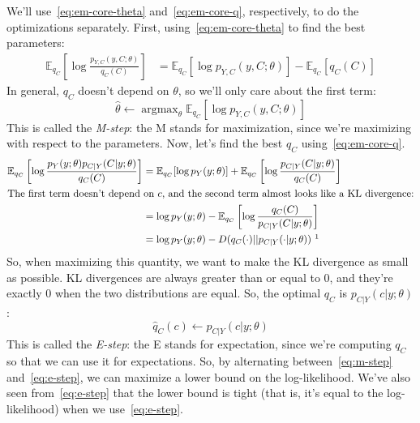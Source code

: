 \documentclass[12pt]{article}
\DeclareMathOperator*{\argmax}{\mathrm{argmax}}
\begin{document}
    We'll use~\eqref{eq:em-core-theta} and~\eqref{eq:em-core-q}, respectively, to
    do the optimizations separately. First, using~\eqref{eq:em-core-theta} to find the
    best parameters:
    \begin{align*}
        \mathbb{E}_{q_C}\left[\log \frac{p_{Y,C}(y,C; \theta)}{q_C(C)} \right]
        &= \mathbb{E}_{q_C}\left[\log p_{Y,C}(y,C; \theta)\right] - \mathbb{E}_{q_C} [q_C(C)]
    \end{align*}
    In general, $q_C$ doesn't depend on $\theta$, so we'll only care about the first term:
    \begin{equation}
        \label{eq:m-step} \boxed{\widehat{\theta} \gets \argmax_\theta \mathbb{E}_{q_C}\left[\log p_{Y,C}(y,C; \theta)\right]}
    \end{equation}
    This is called the \emph{M-step}: the M stands for maximization, since we're
    maximizing with respect to the parameters.
    Now, let's find the best $q_C$ using~\eqref{eq:em-core-q}.
    \begin{align}
        \notag \mathbb{E}_{q_C}\left[\log \frac{p_{Y}(y; \theta)p_{C|Y}(C|y; \theta)}{q_C(C)} \right]
        &= \mathbb{E}_{q_C}[\log p_{Y}(y; \theta)] + \mathbb{E}_{q_C}\left[\log \frac{p_{C|Y}(C|y; \theta)}{q_C(C)}\right] \\
        \intertext{The first term doesn't depend on $c$, and the second term almost looks like a KL divergence:}
        \notag &= \log p_{Y}(y; \theta) - \mathbb{E}_{q_C}\left[\log \frac{q_C(C)}{p_{C|Y}(C|y; \theta)}\right] \\
        \label{eq:e-step-divergence} &= \log p_{Y}(y; \theta) - D(q_C(\cdot)||p_{C|Y}(\cdot|y; \theta))~\footnotemark
    \end{align}
    So, when maximizing this quantity, we want to make the KL divergence as
    small as possible. KL divergences are always greater than or equal to 0,
    and they're exactly 0 when the two distributions are equal. So, the optimal
    $q_C$ is $p_{C|Y}(c|y; \theta)$:
    \begin{equation}
        \label{eq:e-step} \boxed{\widehat{q}_C(c) \gets p_{C|Y}(c|y; \theta)}
    \end{equation}
    This is called the \emph{E-step}: the E stands for expectation, since we're
    computing $q_C$ so that we can use it for expectations.
    So, by alternating between~\eqref{eq:m-step} and~\eqref{eq:e-step}, we can
    maximize a lower bound on the log-likelihood. We've also seen from~\eqref{eq:e-step}
    that the lower bound is tight (that is, it's equal to the log-likelihood)
    when we use~\eqref{eq:e-step}.
\end{document}
